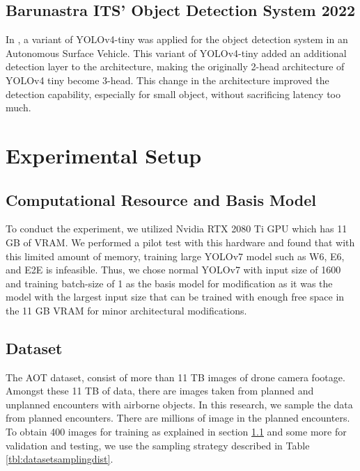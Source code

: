 \documentclass[conference]{IEEEtran}
\begin{document}
\subsection{Barunastra ITS' Object Detection System 2022}
In \cite{barunastra}, a variant of YOLOv4-tiny was applied for the object detection system in
an Autonomous Surface Vehicle. This variant of YOLOv4-tiny added an additional detection layer
to the architecture, making the originally 2-head architecture of YOLOv4 tiny become 3-head.
This change in the architecture improved the detection capability, especially for small object, without
sacrificing latency too much.


\section{Experimental Setup}

\subsection{Computational Resource and Basis Model}
\label{section:instruments}
To conduct the experiment, we utilized Nvidia RTX 2080 Ti GPU which has 11 GB of VRAM.
We performed a pilot test with this hardware and found that
with this limited amount of memory, training large YOLOv7 model such as W6, E6, and E2E
is infeasible. Thus, we chose normal YOLOv7 with input size of 1600 and training batch-size of 1 as the basis model
for modification as it was the model with the largest input size that can be trained with enough free space in the 11 GB VRAM for minor architectural modifications.%


\subsection{Dataset}
\label{section:dataset}
The AOT dataset, consist of more than 11 TB images of drone camera footage.
Amongst these 11 TB of data, there are images taken from planned and unplanned encounters with
airborne objects. In this research, we sample the data from planned encounters.
There are millions of image in the planned encounters. To obtain 400 images
for training as explained in section \ref{section:instruments}
and some more for validation and testing, we use the sampling strategy
described in Table \ref{tbl:datasetsamplingdist}.
\end{document}
